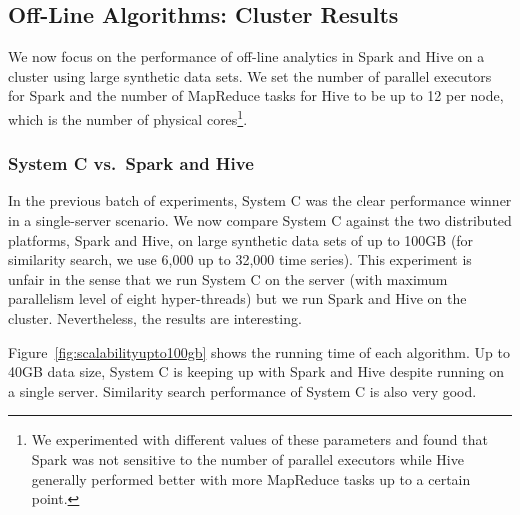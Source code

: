 \documentclass[prodmode,acmtods]{acmsmall}
\begin{document}
\subsection{Off-Line Algorithms: Cluster Results}
\label{sec:results_cluster}

We now focus on the performance of off-line analytics in Spark and Hive on a cluster using large synthetic data sets.  We set the number of parallel executors for Spark and the number of MapReduce tasks for Hive to be up to 12 per node, which is the number of physical cores\footnote{We experimented with different values of these parameters and found that Spark was not sensitive to the number of parallel executors while Hive generally performed better with more MapReduce tasks up to a certain point.}.    


\subsubsection{System C vs.\ Spark and Hive}
\label{sec:largedata}

In the previous batch of experiments, System C was the clear performance winner in a single-server scenario.  We now compare System C against the two distributed platforms, Spark and Hive, on large synthetic data sets of up to 100GB (for similarity search, we use 6,000 up to 32,000 time series).  This experiment is unfair in the sense that we run System C on the server (with maximum parallelism level of eight hyper-threads) but we run Spark and Hive on the cluster.  Nevertheless, the results are interesting. 

Figure~\ref{fig:scalabilityupto100gb} shows the running time of each algorithm.  Up to 40GB data size, System C is keeping up with Spark and Hive despite running on a single server.  Similarity search performance of System C is also very good.

\begin{figure*}[t]
 \centering
 \hspace{-8pt}
 \hspace{-8pt}
 \hspace{-8pt}
 \caption{Execution times using large synthetic data sets.}
  \label{fig:scalabilityupto100gb}
\end{figure*}
\end{document}
